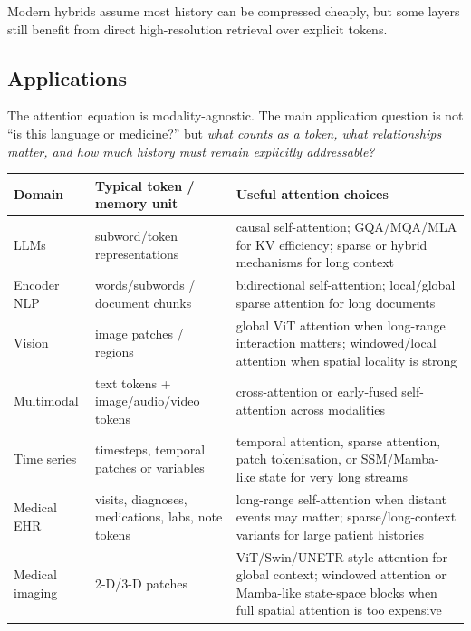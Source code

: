 \begin{calloutmemoryhook}
Modern hybrids assume most history can be compressed cheaply, but some layers still benefit from direct high-resolution retrieval over explicit tokens.
\end{calloutmemoryhook}

\subsection{Applications}
The attention equation is modality-agnostic.
The main application question is not ``is this language or medicine?'' but \textit{what counts as a token, what relationships matter, and how much history must remain explicitly addressable?}

\begin{center}
\small
\begin{tabularx}{.96\linewidth}{@{}L{.18\linewidth}L{.32\linewidth}Y@{}}
\toprule
\textbf{Domain} & \textbf{Typical token / memory unit} & \textbf{Useful attention choices} \\
\midrule
LLMs & subword/token representations & causal self-attention; GQA/MQA/MLA for KV efficiency; sparse or hybrid mechanisms for long context \\
Encoder NLP & words/subwords / document chunks & bidirectional self-attention; local/global sparse attention for long documents \\
Vision & image patches / regions & global ViT attention when long-range interaction matters; windowed/local attention when spatial locality is strong \\
Multimodal & text tokens + image/audio/video tokens & cross-attention or early-fused self-attention across modalities \\
Time series & timesteps, temporal patches or variables & temporal attention, sparse attention, patch tokenisation, or SSM/Mamba-like state for very long streams \\
Medical EHR & visits, diagnoses, medications, labs, note tokens & long-range self-attention when distant events may matter; sparse/long-context variants for large patient histories \\
Medical imaging & 2-D/3-D patches & ViT/Swin/UNETR-style attention for global context; windowed attention or Mamba-like state-space blocks when full spatial attention is too expensive \\
\bottomrule
\end{tabularx}
\end{center}

